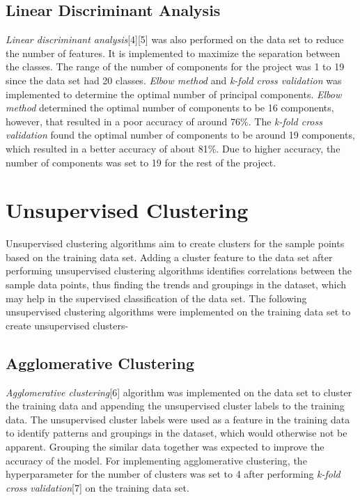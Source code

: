 \documentclass[conference]{IEEEtran}
\begin{document}
\subsection{Linear Discriminant Analysis}
    \textit{Linear discriminant analysis}[4][5] was also performed on the data set to reduce the number of features. It is implemented to maximize the separation between the classes. The range of the number of components for the project was 1 to 19 since the data set had 20 classes. \textit{Elbow method} and \textit{k-fold cross validation} was implemented to determine the optimal number of principal components. \textit{Elbow method} determined the optimal number of components to be 16 components, however, that resulted in a poor accuracy of around 76\%. 
    The \textit{k-fold cross validation} found the optimal number of components to be around 19 components, which resulted in a better accuracy of about 81\%.
    Due to higher accuracy, the number of components was set to 19 for the rest of the project.

\section{Unsupervised Clustering}
    Unsupervised clustering algorithms aim to create clusters for the sample points based on the training data set. Adding a cluster feature to the data set after performing unsupervised clustering algorithms identifies correlations between the sample data points, thus finding the trends and groupings in the dataset, which may help in the supervised classification of the data set. The following unsupervised clustering algorithms were implemented on the training data set to create unsupervised clusters- 
\subsection{Agglomerative Clustering}
    \textit{Agglomerative clustering}[6] algorithm was implemented on the data set to cluster the training data and appending the unsupervised cluster labels to the training data. The unsupervised cluster labels were used as a feature in the training data to identify patterns and groupings in the dataset, which would otherwise not be apparent. Grouping the similar data together was expected to improve the accuracy of the model. For implementing agglomerative clustering, the hyperparameter for the number of clusters was set to 4 after performing \textit{k-fold cross validation}[7] on the training data set. 
\end{document}

